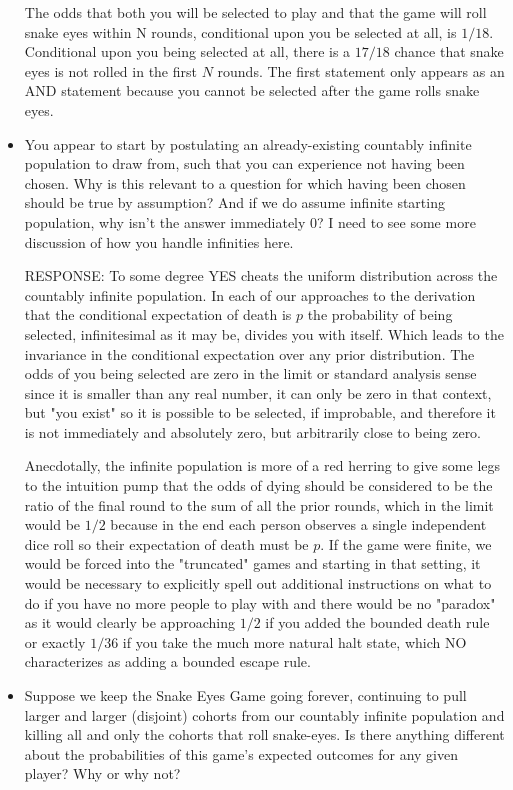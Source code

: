 \documentclass[article,twocolumn]{memoir}
\begin{document}
\begin{itemize}
{        The odds that both you will be selected to play and that the game will roll snake eyes within N rounds, conditional upon you be selected at all, is $1/18$.  Conditional upon you being selected at all, there is a $17/18$ chance that snake eyes is not rolled in the first $N$ rounds.   The first statement only appears as an AND statement because you cannot be selected after the game rolls snake eyes.
    }
\item You appear to start by postulating an already-existing countably infinite population to draw from, such that you can experience not having been chosen. Why is this relevant to a question for which having been chosen should be true by assumption? And if we do assume infinite starting population, why isn’t the answer immediately 0? I need to see some more discussion of how you handle infinities here.

    {\color{violet}
        RESPONSE: 
        To some degree YES cheats the uniform distribution across the countably infinite population.  In each of our approaches to the derivation that the conditional expectation of death is $p$ the probability of being selected, infinitesimal as it may be, divides you with itself.  Which leads to the invariance in the conditional expectation over any prior distribution.  The odds of you being selected are zero in the limit or standard analysis sense since it is smaller than any real number, it can only be zero in that context, but "you exist" so it is possible to be selected, if improbable, and therefore it is not immediately and absolutely zero, but arbitrarily close to being zero.

        Anecdotally, the infinite population is more of a red herring to give some legs to the intuition pump that the odds of dying should be considered to be the ratio of the final round to the sum of all the prior rounds, which in the limit would be $1/2$ because in the end each person observes a single independent dice roll so their expectation of death must be $p$.  If the game were finite, we would be forced into the "truncated" games and starting in that setting, it would be necessary to explicitly spell out additional instructions on what to do if you have no more people to play with and there would be no "paradox" as it would clearly be approaching $1/2$ if you added the bounded death rule or exactly $1/36$ if you take the much more natural halt state, which NO characterizes as adding a bounded escape rule.
    }
\item Suppose we keep the Snake Eyes Game going forever, continuing to pull larger and larger (disjoint) cohorts from our countably infinite population and killing all and only the cohorts that roll snake-eyes. Is there anything different about the probabilities of this game’s expected outcomes for any given player? Why or why not?


\end{itemize}
\end{document}
